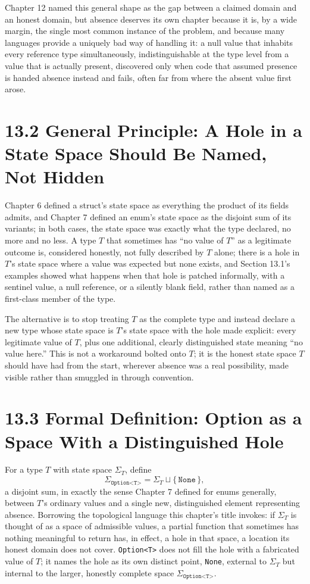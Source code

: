 \documentclass[11pt]{book}
\begin{document}
Chapter 12 named this general shape as the gap between a claimed domain and an honest domain, but absence deserves its own chapter because it is, by a wide margin, the single most common instance of the problem, and because many languages provide a uniquely bad way of handling it: a null value that inhabits every reference type simultaneously, indistinguishable at the type level from a value that is actually present, discovered only when code that assumed presence is handed absence instead and fails, often far from where the absent value first arose.

\section*{13.2 General Principle: A Hole in a State Space Should Be Named, Not Hidden}

Chapter 6 defined a struct's state space as everything the product of its fields admits, and Chapter 7 defined an enum's state space as the disjoint sum of its variants; in both cases, the state space was exactly what the type declared, no more and no less. A type $T$ that sometimes has ``no value of $T$'' as a legitimate outcome is, considered honestly, not fully described by $T$ alone; there is a hole in $T$'s state space where a value was expected but none exists, and Section 13.1's examples showed what happens when that hole is patched informally, with a sentinel value, a null reference, or a silently blank field, rather than named as a first-class member of the type.

The alternative is to stop treating $T$ as the complete type and instead declare a new type whose state space is $T$'s state space with the hole made explicit: every legitimate value of $T$, plus one additional, clearly distinguished state meaning ``no value here.'' This is not a workaround bolted onto $T$; it is the honest state space $T$ should have had from the start, wherever absence was a real possibility, made visible rather than smuggled in through convention.

\section*{13.3 Formal Definition: Option as a Space With a Distinguished Hole}

For a type $T$ with state space $\Sigma_T$, define
\[
\Sigma_{\texttt{Option<T>}} = \Sigma_T \sqcup \{\, \texttt{None} \,\},
\]
a disjoint sum, in exactly the sense Chapter 7 defined for enums generally, between $T$'s ordinary values and a single new, distinguished element representing absence. Borrowing the topological language this chapter's title invokes: if $\Sigma_T$ is thought of as a space of admissible values, a partial function that sometimes has nothing meaningful to return has, in effect, a hole in that space, a location its honest domain does not cover. \texttt{Option<T>} does not fill the hole with a fabricated value of $T$; it names the hole as its own distinct point, \texttt{None}, external to $\Sigma_T$ but internal to the larger, honestly complete space $\Sigma_{\texttt{Option<T>}}$.
\end{document}
